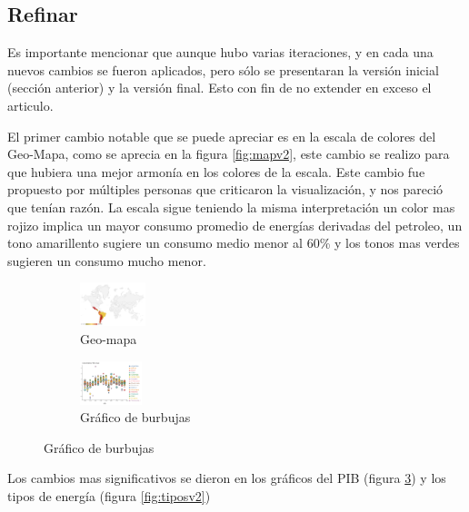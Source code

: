 \documentclass[spanish, letterpaper, 12 pt, conference]{ieeeconf}  %
\begin{document}
\subsection{Refinar}

Es importante mencionar que aunque hubo varias iteraciones, y en cada una nuevos cambios se fueron aplicados, pero sólo se presentaran la versión inicial (sección anterior) y la versión final. Esto con fin de no extender en exceso el articulo.

El primer cambio notable que se puede apreciar es en la escala de colores del Geo-Mapa, como se aprecia en la figura \ref{fig:mapv2}, este cambio se realizo para que hubiera una mejor armonía en los colores de la escala. Este cambio fue propuesto por múltiples personas que criticaron la visualización, y nos pareció que tenían razón. La escala sigue teniendo la misma interpretación un color mas rojizo implica un mayor consumo promedio de energías derivadas del petroleo, un tono amarillento sugiere un consumo medio menor al 60\% y los tonos mas verdes sugieren un consumo mucho menor.    

\begin{figure}[t!]
  \begin{subfigure}
  \centering
  \includegraphics[height=0.5in]{./img/mapav2.png}
  \caption{Geo-mapa}
  \label{fig:mapav2}
\end{subfigure}%
\begin{subfigure}
  \centering
  \includegraphics[height=0.5in]{./img/pibv2.png}
  \caption{Gráfico de burbujas}
  \label{fig:pibv2}
\end{subfigure}
\end{figure}

Los cambios mas significativos se dieron en los gráficos del PIB (figura \ref{fig:pibv2}) y los tipos de energía (figura \ref{fig:tiposv2})
\end{document}
